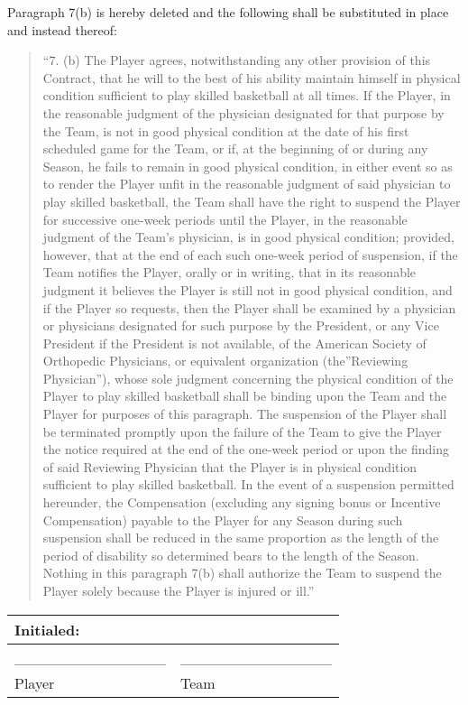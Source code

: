 \documentclass[
]{book}
\begin{document}
Paragraph 7(b) is hereby deleted and the following shall be substituted in place and instead thereof:

\begin{quote}
``7. (b) The Player agrees, notwithstanding any other provision of this Contract, that he will to the best of his ability maintain himself in physical condition sufficient to play skilled basketball at all times. If the Player, in the reasonable judgment of the physician designated for that purpose by the Team, is not in good physical condition at the date of his first scheduled game for the Team, or if, at the beginning of or during any Season, he fails to remain in good physical condition, in either event so as to render the Player unfit in the reasonable judgment of said physician to play skilled basketball, the Team shall have the right to suspend the Player for successive one-week periods until the Player, in the reasonable judgment of the Team's physician, is in good physical condition; provided, however, that at the end of each such one-week period of suspension, if the Team notifies the Player, orally or in writing, that in its reasonable judgment it believes the Player is still not in good physical condition, and if the Player so requests, then the Player shall be examined by a physician or physicians designated for such purpose by the President, or any Vice President if the President is not available, of the American Society of Orthopedic Physicians, or equivalent organization (the''Reviewing Physician''), whose sole judgment concerning the physical condition of the Player to play skilled basketball shall be binding upon the Team and the Player for purposes of this paragraph. The suspension of the Player shall be terminated promptly upon the failure of the Team to give the Player the notice required at the end of the one-week period or upon the finding of said Reviewing Physician that the Player is in physical condition sufficient to play skilled basketball. In the event of a suspension permitted hereunder, the Compensation (excluding any signing bonus or Incentive Compensation) payable to the Player for any Season during such suspension shall be reduced in the same proportion as the length of the period of disability so determined bears to the length of the Season. Nothing in this paragraph 7(b) shall authorize the Team to suspend the Player solely because the Player is injured or ill.''
\end{quote}

\begin{longtable}[]{@{}ll@{}}
\toprule()
Initialed: & \\
\midrule()
\endhead
\_\_\_\_\_\_\_\_\_\_\_\_\_\_ & \_\_\_\_\_\_\_\_\_\_\_\_\_\_ \\
Player & Team \\
\bottomrule()
\end{longtable}
\end{document}

